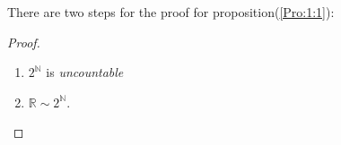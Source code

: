 There are two steps for the proof for proposition(\ref{Pro:1:1}):

\begin{proof}
\begin{enumerate}
\item
$2^{\mathbb{N}}$ is \emph{uncountable}
\item
$\mathbb{R}\sim 2^{\mathbb{N}}$.
\end{enumerate}
\end{proof}


















